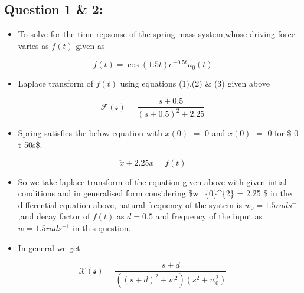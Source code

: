 \documentclass[11pt]{article}
\providecommand{\tightlist}{%
      \setlength{\itemsep}{0pt}\setlength{\parskip}{0pt}}
\begin{document}
    \subsection{Question 1 \& 2:}\label{question-1-2}

\begin{itemize}
\tightlist
\item
  To solve for the time repsonse of the spring mass system,whose driving
  force varies as \(f(t)\) given as
\end{itemize}

\begin{equation}
f(t) = \cos(1.5t) e^{-0.5t}u_0(t)
\end{equation}

\begin{itemize}
\tightlist
\item
  Laplace transform of \(f(t)\) using equations (1),(2) \& (3) given
  above
\end{itemize}

\begin{equation}
    \mathcal{F(s)} = \frac{s+0.5}{(s+0.5)^2 + 2.25}
\end{equation}

\begin{itemize}
\tightlist
\item
  Spring satisfies the below equation with \(x(0)\) \(=\) \(0\) and
  \(\dot x(0)\) \(=\) \(0\) for \$ 0 \leq t \leq 50s\$.
\end{itemize}

\begin{equation}
\ddot x + 2.25x = f(t)
\end{equation}

\begin{itemize}
\item
  So we take laplace transform of the equation given above with given
  intial conditions and in generalised form considering
  \$w\_\{0\}\^{}\{2\} = 2.25 \$ in the differential equation above,
  natural frequency of the system is \(w_0 = 1.5 rads^{-1}\),and decay
  factor of \(f(t)\) as \(d = 0.5\) and frequency of the input as
  \(w = 1.5 rads^{-1}\) in this question.
\item
  In general we get
\end{itemize}

\begin{equation}
    \mathcal{X(s)} = \frac{s+d}{((s+d)^2 + w^2)(s^2 + w_{0}^{2})}
\end{equation}
\end{document}
